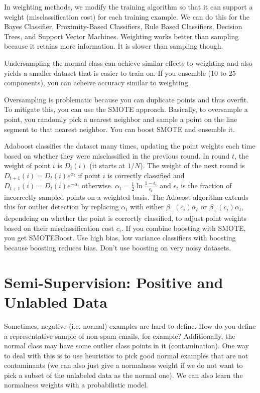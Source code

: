 \documentclass[a4paper]{article}
\begin{document}
In weighting methods, we modify the training algorithm so that it can support
a weight (misclassification cost) for each training example. We can do this for
the Bayes Classifier, Proximity-Based Classifiers, Rule Based Classifiers,
Decision Trees, and Support Vector Machines. Weighting works better than
sampling because it retains more information. It is slower than sampling though.

Undersampling the normal class can achieve similar effects to weighting and
also yields a smaller dataset that is easier to train on. If you ensemble
(10 to 25 components), you can acheive accuracy similar to weighting.

Oversampling is problematic because you can duplicate points and thus overfit.
To mitigate this, you can use the SMOTE approach. Basically, to oversample a
point, you randomly pick a nearest neighbor and sample a point on the line
segment to that nearest neighbor. You can boost SMOTE and ensemble it.

Adaboost classifies the dataset many times, updating the point weights each
time based on whether they were misclassified in the previous round. In round
$t$, the weight of point $i$ is $D_t(i)$ (it starts at $1/N$). The weight
of the next round is $D_{t+1}(i) = D_t(i) e^{\alpha_t}$ if point $i$ is
correctly classified and $D_{t+1}(i) = D_t(i) e^{- \alpha_t}$ otherwise.
$\alpha_t = \frac{1}{2} \ln{\frac{1 - \epsilon_t}{\epsilon_t}}$ and
$\epsilon_t$ is the fraction of incorrectly sampled points on a weighted
basis. The Adacost algorithm extends this for outlier detection by replacing
$\alpha_t$ with either $\beta_{-}(c_i) \alpha_t$ or $\beta_{+}(c_i) \alpha_t$,
dependeing on whether the point is correctly classified, to adjust point weights
based on their misclassification cost $c_i$. If you combine boosting with SMOTE,
you get SMOTEBoost. Use high bias, low variance classifiers with boosting
because boosting reduces bias. Don't use boosting on very noisy datasets.

\section{Semi-Supervision: Positive and Unlabled Data}
Sometimes, negative (i.e. normal) examples are hard to define. How do you define
a representative sample of non-spam emails, for example? Additionally, the
normal class may have some outlier class points in it (contamination). One way
to deal with this is to use heuristics to pick good normal examples that are
not contaminants (we can also just give a normalness weight if we do not want
to pick a subset of the unlabeled data as the normal one). We can also learn the
normalness weights with a probabilistic model.
\end{document}
